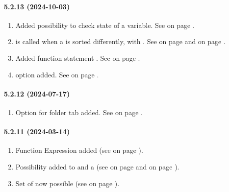 \paragraph{5.2.13 (2024-10-03)}  %
\begin{enumerate}
\item Added possibility to check \EDITABLE{} state of a variable.
      See  on page \pageref{dia:jobeditableaction}.
\item \LIST{} \FUNCTION{} is called when a \LIST{} is sorted differently, with \REASONSORT.
      See  on page \pageref{sec:uilist}
      and  on page \pageref{dia:reasonexpression}.
\item Added function statement \GETSORTCRITERIA.
      See  on page \pageref{dia:guimorestatement}.
\item \FIELDGROUP{} option \INDEX{} added.
      See  on page \pageref{sec:uifieldgroupotions}.
\end{enumerate}

\paragraph{5.2.12 (2024-07-17)}  %
\begin{enumerate}
\item Option \OMITACTIVATE{} for \MAP{} folder tab added.
      See  on page \pageref{dia:jobmapelement}.
\end{enumerate}

\paragraph{5.2.11 (2024-03-14)}  %
\begin{enumerate}
\item Function Expression \GETTEXT{} added
      (see  on page \pageref{dia:functionexpression}).
\item Possibility added to \ENABLE{} and \DISABLE{} a \DIAGRAM{}
      (see  on page \pageref{dia:guistatement} and
        on page \pageref{sec:uinavigatorDiagram}).
\item Set \STYLESHEET{} of \FORM{} now possible
      (see  on page \pageref{dia:guimorestatement}).
\end{enumerate}

